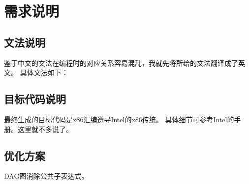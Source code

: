 \section{需求说明}
\subsection{文法说明}
鉴于中文的文法在编程时的对应关系容易混乱，我就先将所给的文法翻译成了英文。
具体文法如下：

\subsection{目标代码说明}
最终生成的目标代码是x86汇编遵寻Intel的x86传统。
具体细节可参考Intel的手册。这里就不多说了。

\subsection{优化方案}
DAG图消除公共子表达式。
